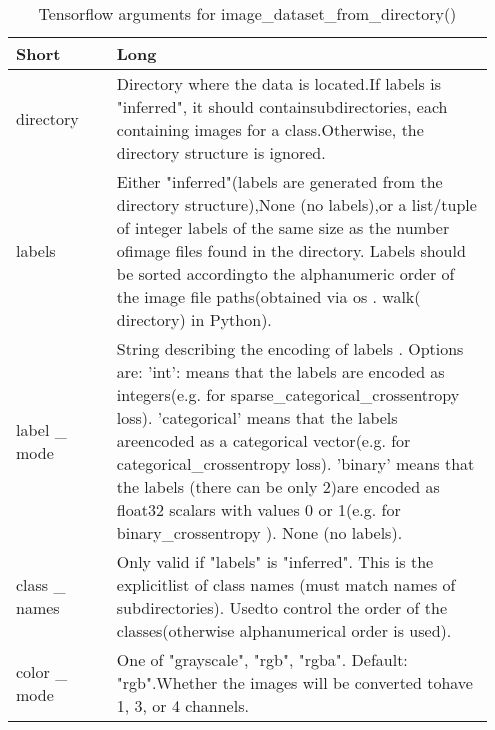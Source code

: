 \documentclass[
	letterpaper, %
	10pt, %
	unnumberedsections, %
	twoside, %
]{LTJournalArticle}
\begin{document}
\begin{table*}[hbt!] %
	\caption{Tensorflow arguments for image\_dataset\_from\_directory()}
	\centering %
	\begin{tabular}{L{0.2\linewidth} L{0.75\linewidth}}
		\toprule
		Short & Long \\
		\midrule
        directory                     & Directory where the data is located.If labels is "inferred", it should containsubdirectories, each containing images for a class.Otherwise, the directory structure is ignored.                                                                                                                                                                                                                                                          \\
        labels                        & Either "inferred"(labels are generated from the directory structure),None (no labels),or a list/tuple of integer labels of the same size as the number ofimage files found in the directory. Labels should be sorted accordingto the alphanumeric order of the image file paths(obtained via os . walk( directory) in Python).                                                                                                           \\
        label \_ mode                 & String describing the encoding of labels . Options are: 'int': means that the labels are encoded as integers(e.g. for sparse\_categorical\_crossentropy loss). 'categorical' means that the labels areencoded as a categorical vector(e.g. for categorical\_crossentropy loss). 'binary' means that the labels (there can be only 2)are encoded as float32 scalars with values 0 or 1(e.g. for binary\_crossentropy ). None (no labels). \\
        class \_ names                & Only valid if "labels" is "inferred". This is the explicitlist of class names (must match names of subdirectories). Usedto control the order of the classes(otherwise alphanumerical order is used).                                                                                                                                                                                                                                     \\
        color \_ mode                 & One of "grayscale", "rgb", "rgba". Default: "rgb".Whether the images will be converted tohave 1, 3, or 4 channels.                                                                                                                                                                                                                                                                                                                       \\

\end{tabular}
\end{table*}
\end{document}
